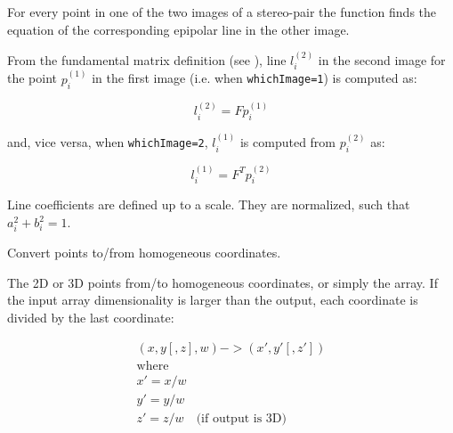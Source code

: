 For every point in one of the two images of a stereo-pair the function finds the equation of the
corresponding epipolar line in the other image.

From the fundamental matrix definition (see ),
line $l^{(2)}_i$ in the second image for the point $p^{(1)}_i$ in the first image (i.e. when \texttt{whichImage=1}) is computed as:

\[ l^{(2)}_i = F p^{(1)}_i \]

and, vice versa, when \texttt{whichImage=2}, $l^{(1)}_i$ is computed from $p^{(2)}_i$ as:

\[ l^{(1)}_i = F^T p^{(2)}_i \]

Line coefficients are defined up to a scale. They are normalized, such that $a_i^2+b_i^2=1$.


Convert points to/from homogeneous coordinates.




\begin{description}
\ifC
{}
\else
{}
\fi
\end{description}

The  2D or 3D points from/to homogeneous coordinates, or simply  the array. If the input array dimensionality is larger than the output, each coordinate is divided by the last coordinate:

\[
\begin{array}{l}
(x,y[,z],w) -> (x',y'[,z'])\\
\text{where} \\
x' = x/w \\
y' = y/w \\
z' = z/w \quad \text{(if output is 3D)}
\end{array}
\]

